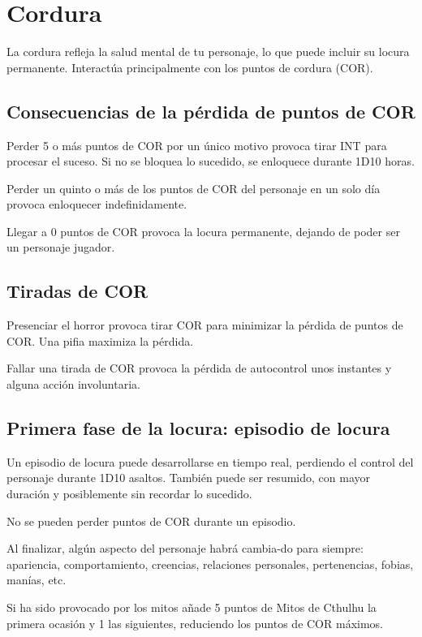 \section{Cordura}

La cordura refleja la salud mental de tu personaje, lo que puede incluir su locura permanente. Interactúa principalmente con los puntos de cordura (COR).

\subsection{Consecuencias de la pérdida de puntos de COR}

Perder 5 o más puntos de COR por un único motivo provoca tirar INT para procesar el suceso. Si no se bloquea lo sucedido, se enloquece durante 1D10 horas. 

Perder un quinto o más de los puntos de COR del personaje en un solo día provoca enloquecer indefinidamente.

Llegar a 0 puntos de COR provoca la locura permanente, dejando de poder ser un personaje jugador.

\subsection{Tiradas de COR}

Presenciar el horror provoca tirar COR para minimizar la pérdida de puntos de COR. Una pifia maximiza la pérdida.

Fallar una tirada de COR provoca la pérdida de autocontrol unos instantes y alguna acción involuntaria.

\subsection{Primera fase de la locura: episodio de locura}

Un episodio de locura puede desarrollarse en tiempo real, perdiendo el control del personaje durante 1D10 asaltos. También puede ser resumido, con mayor duración y posiblemente sin recordar lo sucedido.

No se pueden perder puntos de COR durante un episodio.

Al finalizar, algún aspecto del personaje habrá cambia-do para siempre: apariencia, comportamiento, creencias, relaciones personales, pertenencias, fobias, manías, etc.

Si ha sido provocado por los mitos añade 5 puntos de Mitos de Cthulhu la primera ocasión y 1 las siguientes, reduciendo los puntos de COR máximos.

